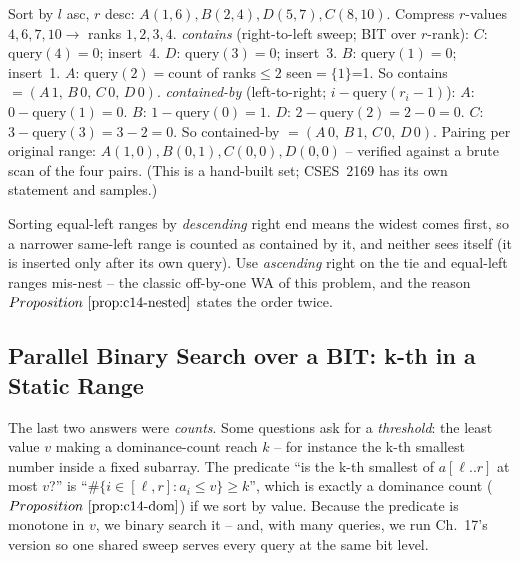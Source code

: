 \begin{tracebox}
Sort by \(l\) asc, \(r\) desc: \(A(1,6), B(2,4), D(5,7), C(8,10)\).  Compress
\(r\)-values \(4,6,7,10\to\) ranks \(1,2,3,4\).
\emph{contains} (right-to-left sweep; BIT over \(r\)-rank):
\(C\): query\((4){=}0\); insert~4.
\(D\): query\((3){=}0\); insert~3.
\(B\): query\((1){=}0\); insert~1.
\(A\): query\((2){=}\)count of ranks\(\le2\) seen\(=\{1\}\)=1. So
contains \(=(A\,1,\,B\,0,\,C\,0,\,D\,0)\).
\emph{contained-by} (left-to-right; \(i-\)query\((r_i-1)\)):
\(A\): \(0-\text{query}(1)=0\).  \(B\): \(1-\text{query}(0)=1\).
\(D\): \(2-\text{query}(2)=2-0=0\).  \(C\): \(3-\text{query}(3)=3-2=0\).  So
contained-by \(=(A\,0,\,B\,1,\,C\,0,\,D\,0)\).
Pairing per original range: \(A(1,0),B(0,1),C(0,0),D(0,0)\) -- verified against
a brute scan of the four pairs.  (This is a hand-built set; CSES~2169 has its
own statement and samples.)
\end{tracebox}

\begin{insightbox}
Sorting equal-left ranges by \emph{descending} right end means the widest comes
first, so a narrower same-left range is counted as contained by it, and neither
sees itself (it is inserted only after its own query).  Use \emph{ascending}
right on the tie and equal-left ranges mis-nest -- the classic off-by-one WA of
this problem, and the reason \(\propref{c14-nested}\) states the order twice.
\end{insightbox}

\subsection{Parallel Binary Search over a BIT: k-th in a Static Range}

The last two answers were \emph{counts}.  Some questions ask for a
\emph{threshold}: the least value \(v\) making a dominance-count reach \(k\) --
for instance the k-th smallest number inside a fixed subarray.  The predicate
``is the k-th smallest of \(a[\ell..r]\) at most \(v\)?'' is ``\(\#\{i\in[\ell,r]:
a_i\le v\}\ge k\)'', which is exactly a dominance count (\(\propref{c14-dom}\))
if we sort by value.  Because the predicate is monotone in \(v\), we binary
search it -- and, with many queries, we run Ch.~17's  version so
one shared sweep serves every query at the same bit level.

